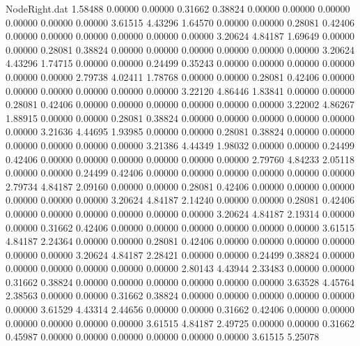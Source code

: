 \begin{filecontents}{NodeRight.dat}
   1.58488    0.00000    0.00000     0.31662    0.38824    0.00000    0.00000    0.00000    0.00000    0.00000    0.00000    3.61515    4.43296
   1.64570    0.00000    0.00000     0.28081    0.42406    0.00000    0.00000    0.00000    0.00000    0.00000    0.00000    3.20624    4.84187
   1.69649    0.00000    0.00000     0.28081    0.38824    0.00000    0.00000    0.00000    0.00000    0.00000    0.00000    3.20624    4.43296
   1.74715    0.00000    0.00000     0.24499    0.35243    0.00000    0.00000    0.00000    0.00000    0.00000    0.00000    2.79738    4.02411
   1.78768    0.00000    0.00000     0.28081    0.42406    0.00000    0.00000    0.00000    0.00000    0.00000    0.00000    3.22120    4.86446
   1.83841    0.00000    0.00000     0.28081    0.42406    0.00000    0.00000    0.00000    0.00000    0.00000    0.00000    3.22002    4.86267
   1.88915    0.00000    0.00000     0.28081    0.38824    0.00000    0.00000    0.00000    0.00000    0.00000    0.00000    3.21636    4.44695
   1.93985    0.00000    0.00000     0.28081    0.38824    0.00000    0.00000    0.00000    0.00000    0.00000    0.00000    3.21386    4.44349
   1.98032    0.00000    0.00000     0.24499    0.42406    0.00000    0.00000    0.00000    0.00000    0.00000    0.00000    2.79760    4.84233
   2.05118    0.00000    0.00000     0.24499    0.42406    0.00000    0.00000    0.00000    0.00000    0.00000    0.00000    2.79734    4.84187
   2.09160    0.00000    0.00000     0.28081    0.42406    0.00000    0.00000    0.00000    0.00000    0.00000    0.00000    3.20624    4.84187
   2.14240    0.00000    0.00000     0.28081    0.42406    0.00000    0.00000    0.00000    0.00000    0.00000    0.00000    3.20624    4.84187
   2.19314    0.00000    0.00000     0.31662    0.42406    0.00000    0.00000    0.00000    0.00000    0.00000    0.00000    3.61515    4.84187
   2.24364    0.00000    0.00000     0.28081    0.42406    0.00000    0.00000    0.00000    0.00000    0.00000    0.00000    3.20624    4.84187
   2.28421    0.00000    0.00000     0.24499    0.38824    0.00000    0.00000    0.00000    0.00000    0.00000    0.00000    2.80143    4.43944
   2.33483    0.00000    0.00000     0.31662    0.38824    0.00000    0.00000    0.00000    0.00000    0.00000    0.00000    3.63528    4.45764
   2.38563    0.00000    0.00000     0.31662    0.38824    0.00000    0.00000    0.00000    0.00000    0.00000    0.00000    3.61529    4.43314
   2.44656    0.00000    0.00000     0.31662    0.42406    0.00000    0.00000    0.00000    0.00000    0.00000    0.00000    3.61515    4.84187
   2.49725    0.00000    0.00000     0.31662    0.45987    0.00000    0.00000    0.00000    0.00000    0.00000    0.00000    3.61515    5.25078

\end{filecontents}
